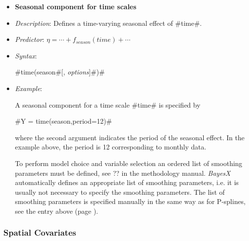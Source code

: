 \begin{itemize}
\item[]{\bf\sffamily Seasonal component for time scales}

\item[] {\em Description}: Defines a time-varying seasonal effect
of #time#. \item[] {\em Predictor}: $\eta =  \cdots +
f_{season}(time) + \cdots $ \item[] {\em Syntax}:

#time(season#[, {\em options}]#)#
\item[] {\em Example}:

A seasonal component for a time scale #time# is specified by

#Y = time(season,period=12)#

where the second argument indicates the period of the seasonal
effect. In the example above, the period is 12 corresponding to
monthly data.

To perform model choice and variable selection an ordered list of smoothing parameters must be defined, see ??
in the methodology manual. {\em BayesX} automatically defines an appropriate list of smoothing parameters, i.e. it
is usually not necessary to  specify the smoothing parameters.
The list of smoothing parameters is specified manually in the same way as for P-splines,
see the entry above (page \pageref{psplines_stepwise}).
\end{itemize}

\subsubsection*{Spatial Covariates}

